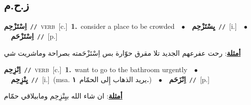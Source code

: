 \documentclass[10pt,a4paper,twoside]{article} %
\begin{document}
\begin{multicols}{2}
{{{{{{{{\vspace{-3mm}
\subsection*{\color{blue}\foreignlanguage{arabic}{ز.ح.م}\color{blue}{}} 

{\setlength\topsep{0pt}\textbf{\foreignlanguage{arabic}{اِسْتَزْحِم}}\ {\color{gray}\texttt{//}\color{black}}\ \textsc{verb}\ [c.]\ \textbf{1.}~consider a place to be crowded\ \ $\bullet$\ \ \setlength\topsep{0pt}\textbf{\foreignlanguage{arabic}{يِسْتَزْحِم}}\ {\color{gray}\texttt{//}\color{black}}\ [i.]\ \ $\bullet$\ \ \setlength\topsep{0pt}\textbf{\foreignlanguage{arabic}{اِسْتَزْحَم}}\ {\color{gray}\texttt{//}\color{black}}\ [p.]\  \begin{flushright}\color{gray}\foreignlanguage{arabic}{\textbf{\underline{\foreignlanguage{arabic}{أمثلة}}}: رحت عفرعهم الجديد تلا مقرق حوّارة بس اِسْتَزْحَمته بصراحة وماشريت شي}\end{flushright}\color{black}} \vspace{2mm}

{\setlength\topsep{0pt}\textbf{\foreignlanguage{arabic}{اِنْزِحِم}}\ {\color{gray}\texttt{//}\color{black}}\ \textsc{verb}\ [c.]\ \textbf{1.}~want to go to the bathroom urgently\ \ $\bullet$\ \ \setlength\topsep{0pt}\textbf{\foreignlanguage{arabic}{يِنْزِحِم}}\ {\color{gray}\texttt{//}\color{black}}\ [i.]\ \color{gray}(msa. \foreignlanguage{arabic}{يريد الذهاب إِلى الحمّام}~\foreignlanguage{arabic}{\textbf{١.}})\color{black}\ \ $\bullet$\ \ \setlength\topsep{0pt}\textbf{\foreignlanguage{arabic}{اِنْزَحَم}}\ {\color{gray}\texttt{//}\color{black}}\ [p.]\  \begin{flushright}\color{gray}\foreignlanguage{arabic}{\textbf{\underline{\foreignlanguage{arabic}{أمثلة}}}: ان شاء الله بيِنْزِحِم ومابيلاقي حمّام}\end{flushright}\color{black}} \vspace{2mm}

}}}}}}}}
\end{multicols}
\end{document}
